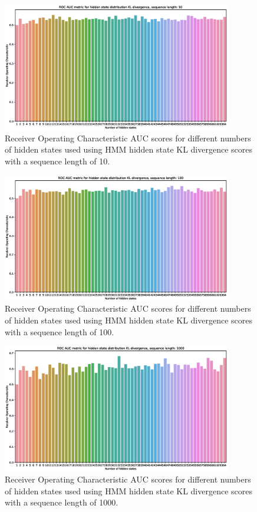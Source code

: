 \documentclass[journal]{IEEEtran}
\begin{document}
\begin{figure}[h]
 \centering
 \includegraphics[width=10cm,keepaspectratio=true]{./roc_kl_score_10.eps}
 \caption{Receiver Operating Characteristic AUC scores for different numbers of hidden states used using HMM hidden state KL divergence scores with a sequence length of 10.}
 \label{figure:roc_kl_10}
\end{figure}

\begin{figure}[h]
 \centering
 \includegraphics[width=10cm,keepaspectratio=true]{./roc_kl_score_100.eps}
 \caption{Receiver Operating Characteristic AUC scores for different numbers of hidden states used using HMM hidden state KL divergence scores with a sequence length of 100.}
 \label{figure:roc_kl_100}
\end{figure}

\begin{figure}[h]
 \centering
 \includegraphics[width=10cm,keepaspectratio=true]{./roc_kl_score_1000.eps}
 \caption{Receiver Operating Characteristic AUC scores for different numbers of hidden states used using HMM hidden state KL divergence scores with a sequence length of 1000.}
 \label{figure:roc_kl_1000}
\end{figure}
\end{document}
